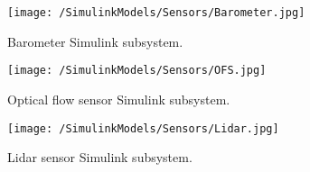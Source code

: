 \begin{figure}[htb]
\begin{center}
	\texttt{[image: /SimulinkModels/Sensors/Barometer.jpg]}%
	\end{center}
	\caption{Barometer Simulink subsystem.}%
\end{figure}

\begin{figure}[htb]
\begin{center}
	\texttt{[image: /SimulinkModels/Sensors/OFS.jpg]}%
	\end{center}
	\caption{Optical flow sensor Simulink subsystem.}%
\end{figure}

\begin{figure}[htb]
\begin{center}
	\texttt{[image: /SimulinkModels/Sensors/Lidar.jpg]}%
	\end{center}
	\caption{Lidar sensor Simulink subsystem.}%
\end{figure}


\clearpage